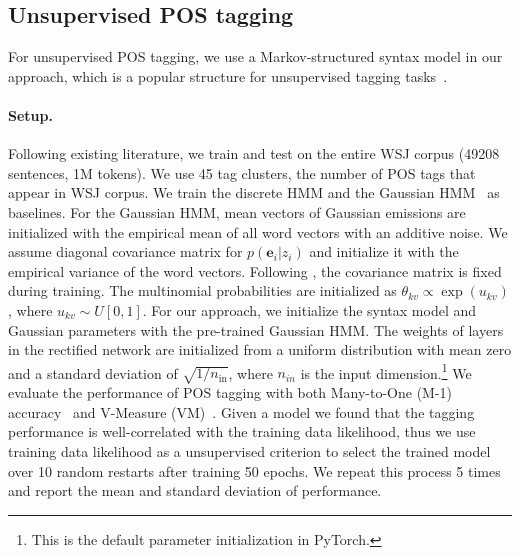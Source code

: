 \documentclass[11pt,a4paper]{article}
\begin{document}
\subsection{Unsupervised POS tagging}
\label{sec:pos}

For unsupervised POS tagging, we use a Markov-structured syntax model in our approach, which is a popular structure for unsupervised tagging tasks~\citep{lin2015unsupervised,tran2016unsupervised}.

\paragraph{Setup.}
Following existing literature, we train and test on the entire WSJ corpus (49208 sentences, 1M tokens). We use 45 tag clusters, the number of POS tags that appear in WSJ corpus. We train the discrete HMM and the Gaussian HMM~\citep{lin2015unsupervised} as baselines. 
For the Gaussian HMM, mean vectors of Gaussian emissions are initialized with the empirical mean of all word vectors with an additive noise.
We assume diagonal covariance matrix for $p(\bm{e}_i|z_i)$ and initialize it with the empirical variance of the word vectors. Following \citet{lin2015unsupervised}, the covariance matrix is fixed during training. The multinomial probabilities are initialized as $\theta_{kv} \propto \exp (u_{kv})$, where $u_{kv} \sim U[0, 1]$.  For our approach, we initialize the syntax model and Gaussian parameters with the pre-trained Gaussian HMM. The weights of layers in the rectified network are initialized from a uniform distribution with mean zero and a standard deviation of $\sqrt{1/n_{\text{in}}}$, where $n_{in}$ is the input dimension.\footnote{This is the default parameter initialization in PyTorch.} We evaluate the performance of POS tagging with both Many-to-One (M-1) accuracy~\citep{johnson2007doesn} and V-Measure (VM)~\citep{rosenberg2007v}. Given a model we found that the tagging performance is well-correlated with the training data likelihood, thus we use training data likelihood as a unsupervised criterion to select the trained model over 10 random restarts after training 50 epochs. We repeat this process 5 times and report the mean and standard deviation of performance.
\end{document}
